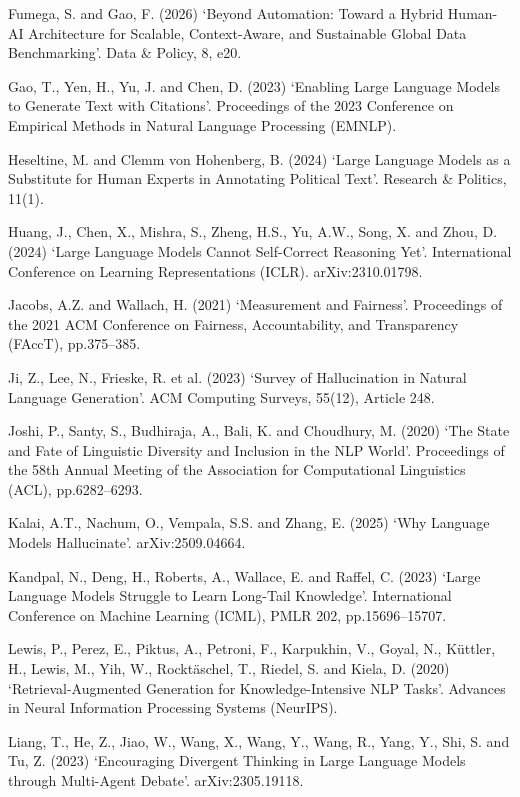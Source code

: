 Fumega, S. and Gao, F. (2026) `Beyond Automation: Toward a Hybrid Human-AI Architecture for Scalable, Context-Aware, and Sustainable Global Data Benchmarking'. Data \& Policy, 8, e20.

Gao, T., Yen, H., Yu, J. and Chen, D. (2023) `Enabling Large Language Models to Generate Text with Citations'. Proceedings of the 2023 Conference on Empirical Methods in Natural Language Processing (EMNLP).

Heseltine, M. and Clemm von Hohenberg, B. (2024) `Large Language Models as a Substitute for Human Experts in Annotating Political Text'. Research \& Politics, 11(1).

Huang, J., Chen, X., Mishra, S., Zheng, H.S., Yu, A.W., Song, X. and Zhou, D. (2024) `Large Language Models Cannot Self-Correct Reasoning Yet'. International Conference on Learning Representations (ICLR). arXiv:2310.01798.

Jacobs, A.Z. and Wallach, H. (2021) `Measurement and Fairness'. Proceedings of the 2021 ACM Conference on Fairness, Accountability, and Transparency (FAccT), pp.375--385.

Ji, Z., Lee, N., Frieske, R. et al. (2023) `Survey of Hallucination in Natural Language Generation'. ACM Computing Surveys, 55(12), Article 248.

Joshi, P., Santy, S., Budhiraja, A., Bali, K. and Choudhury, M. (2020) `The State and Fate of Linguistic Diversity and Inclusion in the NLP World'. Proceedings of the 58th Annual Meeting of the Association for Computational Linguistics (ACL), pp.6282--6293.

Kalai, A.T., Nachum, O., Vempala, S.S. and Zhang, E. (2025) `Why Language Models Hallucinate'. arXiv:2509.04664.

Kandpal, N., Deng, H., Roberts, A., Wallace, E. and Raffel, C. (2023) `Large Language Models Struggle to Learn Long-Tail Knowledge'. International Conference on Machine Learning (ICML), PMLR 202, pp.15696--15707.

Lewis, P., Perez, E., Piktus, A., Petroni, F., Karpukhin, V., Goyal, N., Küttler, H., Lewis, M., Yih, W., Rocktäschel, T., Riedel, S. and Kiela, D. (2020) `Retrieval-Augmented Generation for Knowledge-Intensive NLP Tasks'. Advances in Neural Information Processing Systems (NeurIPS).

Liang, T., He, Z., Jiao, W., Wang, X., Wang, Y., Wang, R., Yang, Y., Shi, S. and Tu, Z. (2023) `Encouraging Divergent Thinking in Large Language Models through Multi-Agent Debate'. arXiv:2305.19118.

